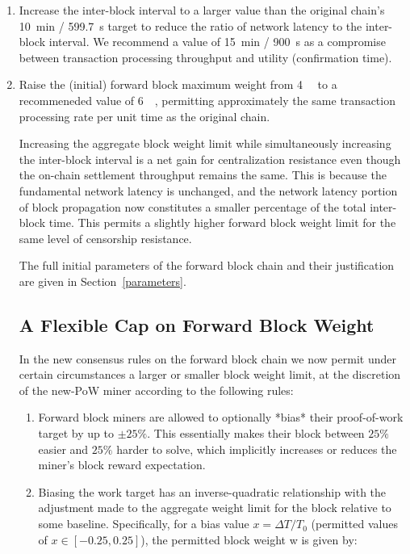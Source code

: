 \begin{enumerate}
  \item
    Increase the inter-block interval to a larger value than the
    original chain's \SI{10}{\minute} / \SI{599.7}{\second} target to
    reduce the ratio of network latency to the inter-block interval.
    We recommend a value of \SI{15}{\minute} / \SI{900}{\second} as a
    compromise between transaction processing throughput and utility
    (confirmation time).

  \item
    Raise the (initial) forward block maximum weight
    from \SI{4}{\mega\weight} to a recommeneded value
    of \SI{6}{\mega\weight}, permitting approximately the same
    transaction processing rate per unit time as the original chain.

Increasing the aggregate block weight limit while simultaneously
increasing the inter-block interval is a net gain for centralization
resistance even though the on-chain settlement throughput remains the
same.  This is because the fundamental network latency is unchanged,
and the network latency portion of block propagation now constitutes a
smaller percentage of the total inter-block time.  This permits a
slightly higher forward block weight limit for the same level of
censorship resistance.

The full initial parameters of the forward block chain and their
justification are given in Section~\ref{parameters}.

\subsection{A Flexible Cap on Forward Block Weight}

In the new consensus rules on the forward block chain we now permit
under certain circumstances a larger or smaller block weight limit, at
the discretion of the new-PoW miner according to the following rules:

\begin{enumerate}
  \item
    Forward block miners are allowed to optionally *bias* their
    proof-of-work target by up to $\pm 25\%$.  This essentially makes
    their block between $25\%$ easier and $25\%$ harder to solve,
    which implicitly increases or reduces the miner's block reward
    expectation.

  \item
    Biasing the work target has an inverse-quadratic relationship with
    the adjustment made to the aggregate weight limit for the block
    relative to some baseline.  Specifically, for a bias value $x =
    \Delta T / T_0$ (permitted values of $x \in [-0.25, 0.25]$), the
    permitted block weight w is given by:


\end{enumerate}
\end{enumerate}
